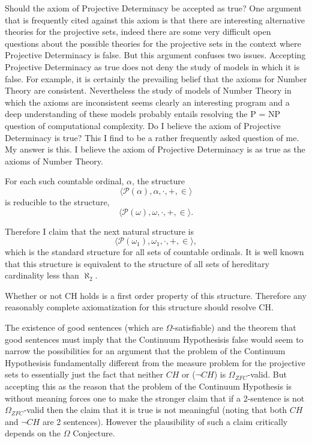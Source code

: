 \documentclass[11pt,a4paper]{book}
\theoremstyle{plain}
\begin{document}
Should the axiom of Projective Determinacy be accepted as true? One argument that is frequently cited against this axiom is that there are interesting alternative theories for the projective sets, indeed there are some very difficult open questions about the possible theories for the projective sets in the context where Projective Determinacy is false. But this argument confuses two issues. Accepting Projective Determinacy as true does not deny the study of models in which it is false. For example, it is certainly the prevailing belief that the axioms for Number Theory are consistent. Nevertheless the study of models of Number Theory in which the axioms are inconsistent seems clearly an interesting program and a deep understanding of these models probably entails resolving the P = NP question of computational complexity. Do I believe the axiom of Projective Determinacy is true? This I find to be a rather frequently asked question of me. My answer is this. I believe the axiom of Projective Determinacy is as true as the axioms of Number Theory. \textcite[pp. 31-32]{woodin2004} 

For each such countable ordinal, $\alpha$, the structure
\[
\langle \mathcal{P}(\alpha), \alpha, \cdot, +, \in \rangle
\]
is reducible to the structure,
\[
\langle \mathcal{P}(\omega), \omega, \cdot, +, \in \rangle.
\]

Therefore I claim that the next natural structure is
\[
\langle \mathcal{P}(\omega_1), \omega_1, \cdot, +, \in \rangle,
\]
which is the standard structure for all sets of countable ordinals. It is well known that
this structure is equivalent to the structure of all sets of hereditary cardinality less than $\aleph_2$.

Whether or not CH holds is a first order property of this structure. Therefore any reasonably complete axiomatization for this structure should resolve CH. \textcite[p. 32]{woodin2004}

The existence of good sentences (which are $\Omega$-satisfiable) and the theorem that good sentences must imply that the Continuum Hypothesisis false would seem to narrow the possibilities for an argument that the problem of the Continuum Hypothesisis fundamentally different from the measure problem for the projective sets to essentially just the fact that neither $CH$ or ($\neg CH$) is $\Omega_{ZFC}$-valid. But accepting this as the reason that the problem of the Continuum Hypothesis is without meaning forces one to make the stronger claim that if a 2-sentence is not $\Omega_{ZFC}$-valid then the claim that it is true is not meaningful (noting that both $CH$ and $\neg CH$ are 2 sentences). However the plausibility of such a claim critically depends on the $\Omega$ Conjecture. \textcite[p. 44]{woodin2004}
\end{document}
